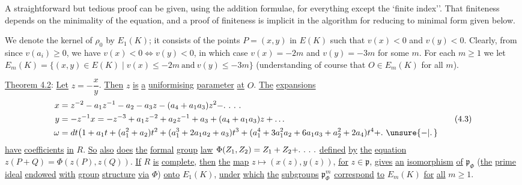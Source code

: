 A straightforward but tedious proof can be given, using the addition formulae, for everything except the `finite index''. That finiteness depends on the minimality of the equation, and a proof of finiteness is implicit in the algorithm for reducing to minimal form given below.

We denote the kernel of $\rho_0$ by $E_1(K)$; it consists of the points $P=(x,y)$ in $E(K)$ such that $v(x)<0$ and $v(y)<0$. Clearly, from  since $v(a_i)\geqslant0$, we have $v(x)<0\Longleftrightarrow v(y)<0$, in which case $v(x)=-2m$ and $v(y)=-3m$ for some $m$. For each $m\geqslant1$ we let $E_m(K)=\{(x,y)\in E(K)\mid v(x)\leq-2m\ \text{and}\ v(y)\leq-3m\}$ (understanding of course that $O\in E_m(K)$ for all $m$).

\uline{Theorem 4.2}: \uline{Let} $z=-\dfrac{x}{y}$. \uline{Then} $z$ \uline{is} \uline{a} \uline{uniformising} \uline{parameter} \uline{at} $O$. \uline{The} \uline{expansions}
\begingroup\scriptsize
\[
\begin{aligned}
x&=z^{-2}-a_1z^{-1}-a_2-a_3z-(a_4+a_1a_3)z^2
 -\ldotp\,\ldotp\,\ldotp\,\ldotp\\
y&=-z^{-1}x=-z^{-3}+a_1z^{-2}+a_2z^{-1}+a_3+(a_4+a_1a_3)z+\ldots\\
\omega&=dt\bigl(1+a_1t+(a_1^2+a_2)t^2+(a_1^3+2a_1a_2+a_3)t^3+
 (a_1^4+3a_1^2a_2+6a_1a_3+a_2^2+2a_4)t^4+\ldotp\,\unsure{-|\ldotp}
\end{aligned}
\tag*{(4.3)}
\]
\endgroup
\uline{have} \uline{coefficients} \uline{in} $R$. \uline{So} \uline{also} \uline{does} \uline{the} \uline{formal}
\uline{group} \uline{law} $\Phi(Z_1,Z_2)=Z_1+Z_2+\ldotp\,\ldotp\,\ldotp\,\ldotp$ \uline{defined} \uline{by} \uline{the} \uline{equation} $z(P+Q)=\Phi(z(P),z(Q))$. \uline{If} $R$ \uline{is} \uline{complete}, \uline{then} \uline{the} \uline{map} $z\longmapsto(x(z),y(z))$, \uline{for} $z\in\mathfrak{p}$, \uline{gives} \uline{an} \uline{isomorphism} \uline{of} $\mathfrak{p}_{\Phi}$ (\uline{the} \uline{prime} \uline{ideal} \uline{endowed} \uline{with} \uline{group} \uline{structure} \uline{via} $\Phi$) \uline{onto} $E_1(K)$, \uline{under} \uline{which} \uline{the} \uline{subgroups} $\mathfrak{p}^m_{\Phi}$ \uline{correspond} \uline{to} $E_m(K)$ \uline{for} \uline{all} $m\geqslant1$.
\endgroup

